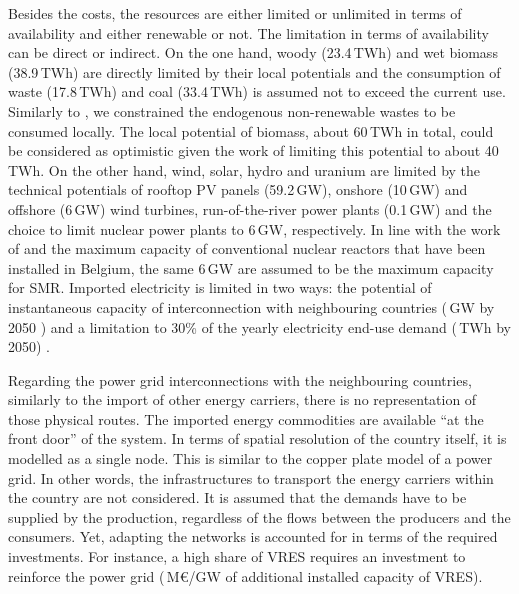 Besides the costs, the resources are either limited or unlimited in terms of availability and either renewable or not. The limitation in terms of availability can be direct or indirect. On the one hand, woody (23.4\,TWh) and wet biomass (38.9\,TWh) are directly limited by their local potentials and the consumption of waste (17.8\,TWh) and coal (33.4\,TWh) is assumed not to exceed the current use. Similarly to \citet{limpens2021generating}, we constrained the endogenous non-renewable wastes to be consumed locally. The local potential of biomass, \ie about 60\,TWh in total, could be considered as optimistic given the work of \citet{colla2024navigating} limiting this potential to about 40\,TWh. On the other hand, wind, solar, hydro and uranium are limited by the technical potentials of rooftop \gls{PV} panels (59.2\,GW), onshore (10\,GW) and offshore (6\,GW) wind turbines, run-of-the-river power plants (0.1\,GW) and the choice to limit nuclear power plants to 6\,GW, respectively. In line with the work of \citet{PATHS2050} and the maximum capacity of conventional nuclear reactors that have been installed in Belgium, the same 6\,GW are assumed to be the maximum capacity for \gls{SMR}. Imported electricity is limited in two ways: the potential of instantaneous capacity of interconnection with neighbouring countries (\,GW by 2050 \cite{ELIA_2050}) and a limitation to 30\% of the yearly electricity end-use demand (\,TWh by 2050) \cite{limpens2021generating}. 

Regarding the power grid interconnections with the neighbouring countries, similarly to the import of other energy carriers, there is no representation of those physical routes. The imported energy commodities are available ``at the front door'' of the system.  In terms of spatial resolution of the country itself, it is modelled as a single node. This is similar to the copper plate model of a power grid. In other words, the infrastructures to transport the energy carriers within the country are not considered.  It is assumed that the demands have to be supplied by the production, regardless of the flows between the producers and the consumers. Yet, adapting the networks is accounted for in terms of the required investments. For instance, a high share of VRES requires an investment to reinforce the power grid (\,M€/GW of additional installed capacity of \gls{VRES}). 

